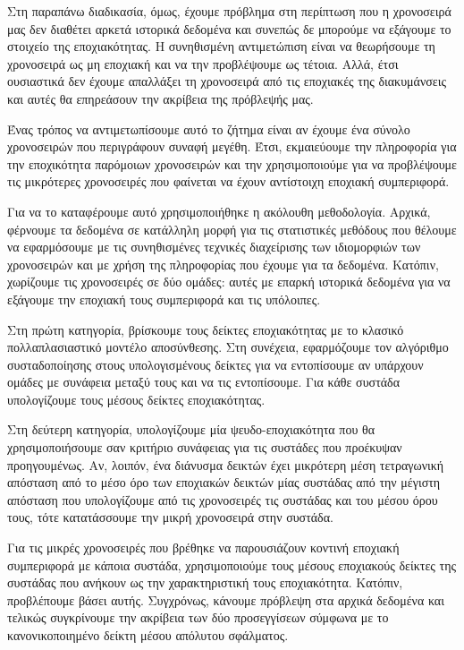 Στη παραπάνω διαδικασία, όμως, έχουμε πρόβλημα στη περίπτωση που η χρονοσειρά μας δεν διαθέτει αρκετά ιστορικά δεδομένα και συνεπώς δε μπορούμε να εξάγουμε το στοιχείο της εποχιακότητας. Η συνηθισμένη αντιμετώπιση είναι να θεωρήσουμε τη χρονοσειρά ως μη εποχιακή και να την προβλέψουμε ως τέτοια. Αλλά, έτσι ουσιαστικά δεν έχουμε απαλλάξει τη χρονοσειρά από τις εποχιακές της διακυμάνσεις και αυτές θα επηρεάσουν την ακρίβεια της πρόβλεψής μας. 

Ένας τρόπος να αντιμετωπίσουμε αυτό το ζήτημα είναι αν έχουμε ένα σύνολο χρονοσειρών που περιγράφουν συναφή μεγέθη. Έτσι, εκμαιεύουμε την πληροφορία για την εποχικότητα παρόμοιων χρονοσειρών και την χρησιμοποιούμε για να προβλέψουμε τις μικρότερες χρονοσειρές που φαίνεται να έχουν αντίστοιχη εποχιακή συμπεριφορά.

Για να το καταφέρουμε αυτό χρησιμοποιήθηκε η ακόλουθη μεθοδολογία. Αρχικά, φέρνουμε τα δεδομένα σε κατάλληλη μορφή για τις στατιστικές μεθόδους που θέλουμε να εφαρμόσουμε με τις συνηθισμένες τεχνικές διαχείρισης των ιδιομορφιών των χρονοσειρών και με χρήση της πληροφορίας που έχουμε για τα δεδομένα. Κατόπιν, χωρίζουμε τις χρονοσειρές σε δύο ομάδες: αυτές με επαρκή ιστορικά δεδομένα για να εξάγουμε την εποχιακή τους συμπεριφορά και τις υπόλοιπες.

Στη πρώτη κατηγορία, βρίσκουμε τους δείκτες εποχιακότητας με το κλασικό πολλαπλασιαστικό μοντέλο αποσύνθεσης. Στη συνέχεια, εφαρμόζουμε τον αλγόριθμο συσταδοποίησης  στους υπολογισμένους δείκτες για να εντοπίσουμε αν υπάρχουν ομάδες με συνάφεια μεταξύ τους και να τις εντοπίσουμε. Για κάθε συστάδα υπολογίζουμε τους μέσους δείκτες εποχιακότητας.

Στη δεύτερη κατηγορία, υπολογίζουμε μία ψευδο-εποχιακότητα που θα χρησιμοποιήσουμε σαν κριτήριο συνάφειας για τις συστάδες που προέκυψαν προηγουμένως. Αν, λοιπόν, ένα διάνυσμα δεικτών έχει μικρότερη μέση τετραγωνική απόσταση από το μέσο όρο των εποχιακών δεικτών μίας συστάδας από την μέγιστη απόσταση που υπολογίζουμε από τις χρονοσειρές τις συστάδας και του μέσου όρου τους, τότε κατατάσσουμε την μικρή χρονοσειρά στην συστάδα.

Για τις μικρές χρονοσειρές που βρέθηκε να παρουσιάζουν κοντινή εποχιακή συμπεριφορά με κάποια συστάδα, χρησιμοποιούμε τους μέσους εποχιακούς δείκτες της συστάδας που ανήκουν ως την χαρακτηριστική τους εποχιακότητα. Κατόπιν, προβλέπουμε βάσει αυτής. Συγχρόνως, κάνουμε πρόβλεψη στα αρχικά δεδομένα και τελικώς συγκρίνουμε την ακρίβεια των δύο προσεγγίσεων σύμφωνα με το κανονικοποιημένο δείκτη μέσου απόλυτου σφάλματος.

